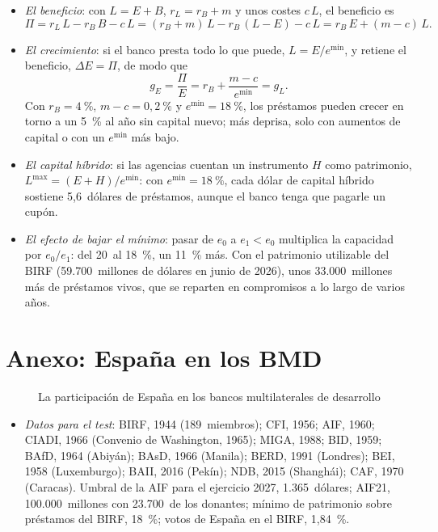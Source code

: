 \documentclass[11pt]{article}
\begin{document}
\begin{itemize}
\item \emph{El beneficio}: con $L=E+B$, $r_L=r_B+m$ y unos costes $c\,L$, el beneficio es
  \[
  \Pi=r_L\,L-r_B\,B-c\,L=(r_B+m)\,L-r_B\,(L-E)-c\,L=r_B\,E+(m-c)\,L .
  \]
\item \emph{El crecimiento}: si el banco presta todo lo que puede, $L=E/e^{\min}$, y retiene el beneficio, $\Delta E=\Pi$, de modo que
  \[
  g_E=\frac{\Pi}{E}=r_B+\frac{m-c}{e^{\min}}=g_L .
  \]
  Con $r_B=4~\%$, $m-c=0{,}2~\%$ y $e^{\min}=18~\%$, los préstamos pueden crecer en torno a un 5~\% al año sin capital nuevo; más deprisa, solo con aumentos de capital o con un $e^{\min}$ más bajo. \findemo
\item \emph{El capital híbrido}: si las agencias cuentan un instrumento $H$ como patrimonio, $L^{\max}=(E+H)/e^{\min}$: con $e^{\min}=18~\%$, cada dólar de capital híbrido sostiene 5,6~dólares de préstamos, aunque el banco tenga que pagarle un cupón.
\item \emph{El efecto de bajar el mínimo}: pasar de $e_0$ a $e_1<e_0$ multiplica la capacidad por $e_0/e_1$: del 20~al 18~\%, un 11~\% más. Con el patrimonio utilizable del BIRF (59.700~millones de dólares en junio de 2026), unos 33.000~millones más de préstamos vivos, que se reparten en compromisos a lo largo de varios años\nocite{BM2026InformeAnual}.
\end{itemize}

\section{Anexo: España en los BMD}\label{anexo:espana}

\begin{figure}[H]
\centering
\caption{La participación de España en los bancos multilaterales de desarrollo}\label{fig:votos-espana}
\end{figure}

\begin{anotaciones}
\begin{itemize}
\item \emph{Datos para el test}: BIRF, 1944 (189~miembros); CFI, 1956; AIF, 1960; CIADI, 1966 (Convenio de Washington, 1965); MIGA, 1988; BID, 1959; BAfD, 1964 (Abiyán); BAsD, 1966 (Manila); BERD, 1991 (Londres); BEI, 1958 (Luxemburgo); BAII, 2016 (Pekín); NDB, 2015 (Shanghái); CAF, 1970 (Caracas). Umbral de la AIF para el ejercicio 2027, 1.365~dólares; AIF21, 100.000~millones con 23.700~de los donantes; mínimo de patrimonio sobre préstamos del BIRF, 18~\%; votos de España en el BIRF, 1,84~\%.
\end{itemize}
\end{anotaciones}
\end{document}
